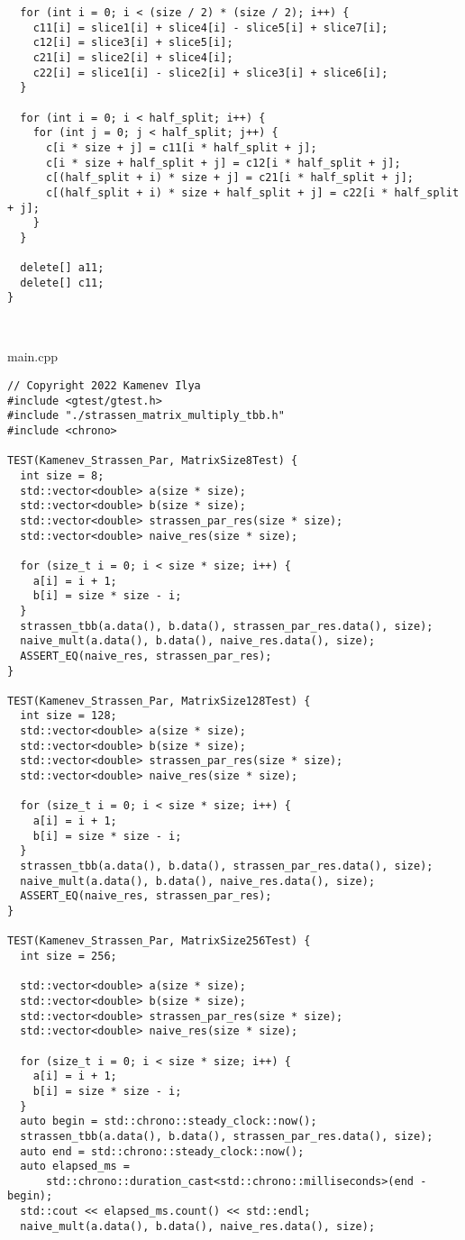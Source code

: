 \documentclass{report}
\begin{document}
\begin{lstlisting}
  for (int i = 0; i < (size / 2) * (size / 2); i++) {
    c11[i] = slice1[i] + slice4[i] - slice5[i] + slice7[i];
    c12[i] = slice3[i] + slice5[i];
    c21[i] = slice2[i] + slice4[i];
    c22[i] = slice1[i] - slice2[i] + slice3[i] + slice6[i];
  }

  for (int i = 0; i < half_split; i++) {
    for (int j = 0; j < half_split; j++) {
      c[i * size + j] = c11[i * half_split + j];
      c[i * size + half_split + j] = c12[i * half_split + j];
      c[(half_split + i) * size + j] = c21[i * half_split + j];
      c[(half_split + i) * size + half_split + j] = c22[i * half_split + j];
    }
  }

  delete[] a11;
  delete[] c11;
}



\end{lstlisting}
main.cpp
\begin{lstlisting}
// Copyright 2022 Kamenev Ilya
#include <gtest/gtest.h>
#include "./strassen_matrix_multiply_tbb.h"
#include <chrono>

TEST(Kamenev_Strassen_Par, MatrixSize8Test) {
  int size = 8;
  std::vector<double> a(size * size);
  std::vector<double> b(size * size);
  std::vector<double> strassen_par_res(size * size);
  std::vector<double> naive_res(size * size);

  for (size_t i = 0; i < size * size; i++) {
    a[i] = i + 1;
    b[i] = size * size - i;
  }
  strassen_tbb(a.data(), b.data(), strassen_par_res.data(), size);
  naive_mult(a.data(), b.data(), naive_res.data(), size);
  ASSERT_EQ(naive_res, strassen_par_res);
}

TEST(Kamenev_Strassen_Par, MatrixSize128Test) {
  int size = 128;
  std::vector<double> a(size * size);
  std::vector<double> b(size * size);
  std::vector<double> strassen_par_res(size * size);
  std::vector<double> naive_res(size * size);

  for (size_t i = 0; i < size * size; i++) {
    a[i] = i + 1;
    b[i] = size * size - i;
  }
  strassen_tbb(a.data(), b.data(), strassen_par_res.data(), size);
  naive_mult(a.data(), b.data(), naive_res.data(), size);
  ASSERT_EQ(naive_res, strassen_par_res);
}

TEST(Kamenev_Strassen_Par, MatrixSize256Test) {
  int size = 256;

  std::vector<double> a(size * size);
  std::vector<double> b(size * size);
  std::vector<double> strassen_par_res(size * size);
  std::vector<double> naive_res(size * size);

  for (size_t i = 0; i < size * size; i++) {
    a[i] = i + 1;
    b[i] = size * size - i;
  }
  auto begin = std::chrono::steady_clock::now();
  strassen_tbb(a.data(), b.data(), strassen_par_res.data(), size);
  auto end = std::chrono::steady_clock::now();
  auto elapsed_ms =
      std::chrono::duration_cast<std::chrono::milliseconds>(end - begin);
  std::cout << elapsed_ms.count() << std::endl;
  naive_mult(a.data(), b.data(), naive_res.data(), size);


\end{lstlisting}
\end{document}
